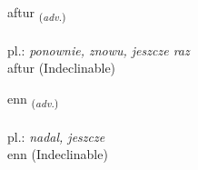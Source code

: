 \documentclass[frontgrid, backgrid]{flacards}\usepackage[]{graphicx}\usepackage[]{xcolor}
\begin{document}

\renewcommand{\flhead}{\vskip5pt \fboxsep=0pt {\small\bfseries\footnotesize Atviksorð | przysłówek}}
\renewcommand{\fcfoot}{\vskip5pt \fboxsep=0pt \hspace{2pt}{\small\bfseries\footnotesize 1K}}

\renewcommand{\blhead}{\vskip5pt {\small\bfseries\footnotesize Atviksorð | przysłówek }}
\renewcommand{\bcfoot}{\vskip5pt \hspace{2pt}{\small\bfseries\footnotesize 1K}}


{aftur \small{\textsubscript{(\textit{adv.})}} \\[1ex]
\textphonetic{[aftʏr]} \\
pl.: \emph{ponownie, znowu, jeszcze raz} \\  [2ex]
aftur (Indeclinable)}


\renewcommand{\flhead}{\vskip5pt \fboxsep=0pt {\small\bfseries\footnotesize Atviksorð | przysłówek}}
\renewcommand{\fcfoot}{\vskip5pt \fboxsep=0pt \hspace{2pt}{\small\bfseries\footnotesize 1K}}

\renewcommand{\blhead}{\vskip5pt {\small\bfseries\footnotesize Atviksorð | przysłówek }}
\renewcommand{\bcfoot}{\vskip5pt \hspace{2pt}{\small\bfseries\footnotesize 1K}}


{enn \small{\textsubscript{(\textit{adv.})}} \\[1ex]
\textphonetic{[ɛn]} \\
pl.: \emph{nadal, jeszcze} \\  [2ex]
enn (Indeclinable)}


\renewcommand{\flhead}{\vskip5pt \fboxsep=0pt {\small\bfseries\footnotesize Upphrópanir | okrzyk}}
\renewcommand{\fcfoot}{\vskip5pt \fboxsep=0pt \hspace{2pt}{\small\bfseries\footnotesize 1K}}

\renewcommand{\blhead}{\vskip5pt {\small\bfseries\footnotesize Upphrópanir | okrzyk }}
\renewcommand{\bcfoot}{\vskip5pt \hspace{2pt}{\small\bfseries\footnotesize 1K}}
\end{document}
